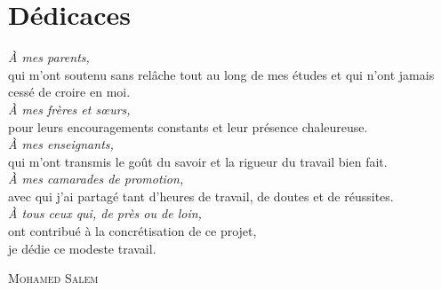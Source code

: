 \chapter*{Dédicaces}
\thispagestyle{empty}

\vspace{2cm}

\begin{center}
\itshape

\textit{À mes parents,}\\[0.5em]
qui m'ont soutenu sans relâche tout au long de mes études et qui n'ont
jamais cessé de croire en moi.\\[1.5em]

\textit{À mes frères et sœurs,}\\[0.5em]
pour leurs encouragements constants et leur présence chaleureuse.\\[1.5em]

\textit{À mes enseignants,}\\[0.5em]
qui m'ont transmis le goût du savoir et la rigueur du travail bien fait.\\[1.5em]

\textit{À mes camarades de promotion,}\\[0.5em]
avec qui j'ai partagé tant d'heures de travail, de doutes et de réussites.\\[1.5em]

\textit{À tous ceux qui, de près ou de loin,}\\[0.5em]
ont contribué à la concrétisation de ce projet,\\
je dédie ce modeste travail.

\vfill

\textsc{Mohamed Salem}
\end{center}
